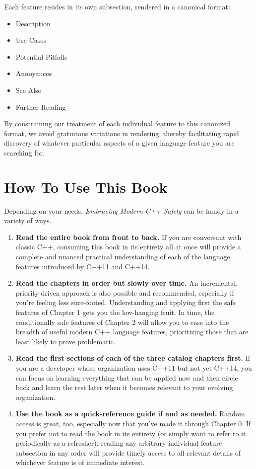 Each feature resides in its own subsection, rendered in a canonical format:
\begin{itemize}
\item{Description}
\item{Use Cases}
\item{Potential Pitfalls}
\item{Annoyances}
\item{See Also}
\item{Further Reading}
\end{itemize}%
By constraining our treatment of each individual feature to this canonized format, we avoid gratuitous variations in rendering, thereby facilitating rapid discovery of whatever particular aspects of a given language feature you are searching for.

\section{How To Use This Book}

Depending on your needs, \textit{Embracing Modern C++ Safely} can be handy in a variety of ways.
\begin{enumerate}
\item{\textbf{Read the entire book from front to back.} If you are conversant with classic C++, consuming this book in its entirety all at once will provide a complete and nuanced practical understanding of each of the language features introduced by C++11 and C++14.}
\item{\textbf{Read the chapters in order but slowly over time.} An incremental, priority-driven approach is also possible and recommended, especially if you're feeling less sure-footed. Understanding and applying first the safe features of Chapter 1 gets you the low-hanging fruit. In time, the conditionally safe features of Chapter 2 will allow you to ease into the breadth of useful modern C++ language features, prioritizing those that are least likely to prove problematic.}
\item{\textbf{Read the first sections of each of the three catalog chapters first.} If you are a developer whose organization uses C++11 but not yet C++14, you can focus on learning everything that can be applied now and then circle back and learn the rest later when it becomes relevant to your evolving organization.}
\item{\textbf{Use the book as a quick-reference guide if and as needed.} Random access is great, too, especially now that you've made it through Chapter 0. If you prefer not to read the book in its entirety (or simply want to refer to it periodically as a refresher), reading any arbitrary individual feature subsection in any order will provide timely access to all relevant details of whichever feature is of immediate interest.}
\end{enumerate}

